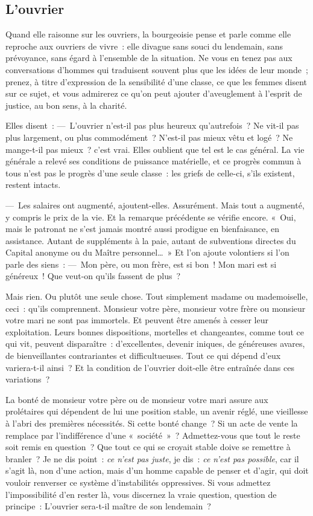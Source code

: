 \documentclass[french,twoside]{book} %
\begin{document}
\subsection[{L’ouvrier}]{L’ouvrier}
\noindent Quand elle raisonne sur les ouvriers, la bourgeoisie pense et parle comme elle reproche aux ouvriers de vivre : elle divague sans souci du lendemain, sans prévoyance, sans égard à l’ensemble de la situation. Ne vous en tenez pas aux conversations d’hommes qui traduisent souvent plus que les idées de leur monde ; prenez, à titre d’expression de la sensibilité d’une classe, ce que les femmes disent sur ce sujet, et vous admirerez ce qu’on peut ajouter d’aveuglement à l’esprit de justice, au bon sens, à la charité.\par
Elles disent : — L’ouvrier n’est-il pas plus heureux qu’autrefois ? Ne vit-il pas plus largement, ou plus commodément ? N’est-il pas mieux vêtu et logé ? Ne mange-t-il pas mieux ? c’est vrai. Elles oublient que tel est le cas général. La vie générale a relevé ses conditions de puissance matérielle, et ce progrès commun à tous n’est pas le progrès d’une seule classe : les griefs de celle-ci, s’ils existent, restent intacts.\par
— Les salaires ont augmenté, ajoutent-elles. Assurément. Mais tout a augmenté, y compris le prix de la vie. Et la remarque précédente se vérifie encore. « Oui, mais le patronat ne s’est jamais montré aussi prodigue en bienfaisance, en assistance. Autant de suppléments à la paie, autant de subventions directes du Capital anonyme ou du Maître personnel… » Et l’on ajoute volontiers si l’on parle des siens : — Mon père, ou mon frère, est si bon ! Mon mari est si généreux ! Que veut-on qu’ils fassent de plus ?\par
Mais rien. Ou plutôt une seule chose. Tout simplement madame ou mademoiselle, ceci : qu’ils comprennent. Monsieur votre père, monsieur votre frère ou monsieur votre mari ne sont pas immortels. Et peuvent être amenés à cesser leur exploitation. Leurs bonnes dispositions, mortelles et changeantes, comme tout ce qui vit, peuvent disparaître : d’excellentes, devenir iniques, de généreuses avares, de bienveillantes contrariantes et difficultueuses. Tout ce qui dépend d’eux variera-t-il ainsi ? Et la condition de l’ouvrier doit-elle être entraînée dans ces variations ?\par
La bonté de monsieur votre père ou de monsieur votre mari assure aux prolétaires qui dépendent de lui une position stable, un avenir réglé, une vieillesse à l’abri des premières nécessités. Si cette bonté change ? Si un acte de vente la remplace par l’indifférence d’une « société » ? Admettez-vous que tout le reste soit remis en question ? Que tout ce qui se croyait stable doive se remettre à branler ? Je ne dis point : \emph{ce n’est pas juste}, je dis : \emph{ce n’est pas possible}, car il s’agit là, non d’une action, mais d’un homme capable de penser et d’agir, qui doit vouloir renverser ce système d’instabilités oppressives. Si vous admettez l’impossibilité d’en rester là, vous discernez la vraie question, question de principe : L’ouvrier sera-t-il maître de son lendemain ?\par
\end{document}

